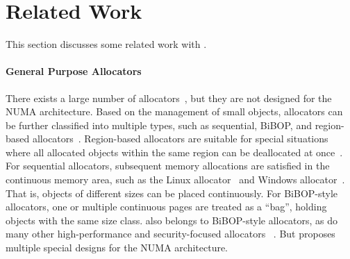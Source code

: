 \section{Related Work}

\label{sec:related}

This section discusses some related work with \NM{}. 

\paragraph{General Purpose Allocators}
 There exists a large number of allocators~\cite{dlmalloc,Hoard,tcmalloc,jemalloc,Scalloc}, but they are not designed for the NUMA architecture. Based on the management of small objects, allocators can be further classified into multiple types, such as sequential, BiBOP, and region-based allocators~\cite{Gay:1998:MME:277650.277748,  DieHarder}. Region-based allocators are suitable for special situations where all allocated objects within the same region can be deallocated at once~\cite{Gay:1998:MME:277650.277748}. For sequential allocators, subsequent memory allocations are satisfied in the continuous memory area, such as the Linux allocator~\cite{dlmalloc} and Windows allocator~\cite{DieHarder}. That is, objects of different sizes can be placed continuously. For BiBOP-style allocators, one or multiple continuous pages are treated as a ``bag'', holding objects with the same size class. \NM{} also belongs to BiBOP-style allocators, as do many other high-performance and security-focused allocators ~\cite{tcmalloc, jemalloc, Hoard, Scalloc, DieHarder}. But \NM{}
  proposes multiple special designs for the NUMA architecture.
 

